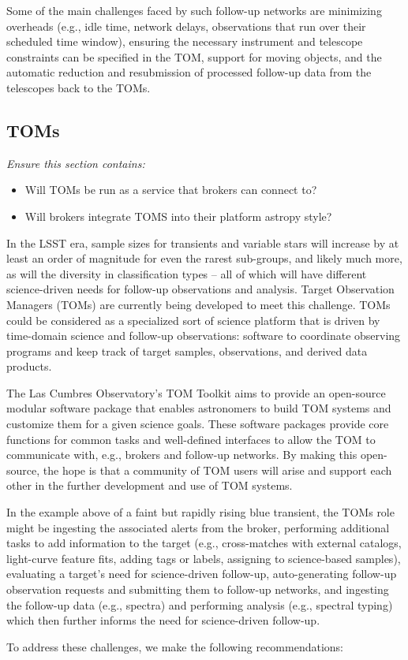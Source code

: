 
Some of the main challenges faced by such follow-up networks are minimizing overheads (e.g., idle time, network delays, observations that run over their scheduled time window), ensuring the necessary instrument and telescope constraints can be specified in the TOM, support for moving objects, and the automatic reduction and resubmission of processed follow-up data from the telescopes back to the TOMs. 

\subsection{TOMs}

\smallskip
\noindent
{\it Ensure this section contains:
\begin{itemize}
    \item Will TOMs be run as a service that brokers can connect to?
    \item Will brokers integrate TOMS into their platform astropy style?
\end{itemize}
}

In the LSST era, sample sizes for transients and variable stars will increase by at least an order of magnitude for even the rarest sub-groups, and likely much more, as will the diversity in classification types -- all of which will have different science-driven needs for follow-up observations and analysis. Target Observation Managers (TOMs) are currently being developed to meet this challenge. TOMs could be considered as a specialized sort of science platform that is driven by time-domain science and follow-up observations: software to coordinate observing programs and keep track of target samples, observations, and derived data products. 

The Las Cumbres Observatory's TOM Toolkit aims to provide an open-source modular software package that enables astronomers to build TOM systems and customize them for a given science goals. These software packages provide core functions for common tasks and well-defined interfaces to allow the TOM to communicate with, e.g., brokers and follow-up networks. By making this open-source, the hope is that a community of TOM users will arise and support each other in the further development and use of TOM systems. 

In the example above of a faint but rapidly rising blue transient, the TOMs role might be ingesting the associated alerts from the broker, performing additional tasks to add information to the target (e.g., cross-matches with external catalogs, light-curve feature fits, adding tags or labels, assigning to science-based samples), evaluating a target's need for science-driven follow-up, auto-generating follow-up observation requests and submitting them to follow-up networks, and ingesting the follow-up data (e.g., spectra) and performing analysis (e.g., spectral typing) which then further informs the need for science-driven follow-up.


To  address these challenges, we make the following recommendations: 